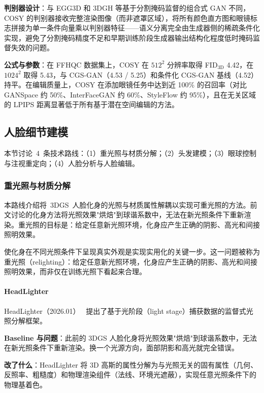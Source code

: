 \textbf{判别器设计}：与 EGG3D 和 3DGH 等基于分割掩码监督的组合式 GAN 不同，COSY 的判别器接收完整渲染图像（而非遮罩区域），将所有颜色直方图和眼镜标志拼接为单一条件向量乘以判别器特征——语义分离完全由生成器侧的稀疏条件化实现，避免了分割掩码精度不足和早期训练阶段生成器输出结构化程度低时掩码监督失效的问题。

\textbf{公式与参数}：在 FFHQC 数据集上，COSY 在 $512^2$ 分辨率取得 FID$_\text{3D}$ 4.42，在 $1024^2$ 取得 5.43，与 CGS-GAN（4.53 / 5.25）和条件化 CGS-GAN 基线（4.52）持平。在编辑质量上，COSY 在添加眼镜任务中达到近 100\% 的召回率（对比 GANSpace 约 50\%、InterFaceGAN 约 60\%、StyleFlow 约 95\%），且在无关区域的 LPIPS 距离显著低于所有基于潜在空间编辑的方法。

\subsection{人脸细节建模}
\label{ss:16_1c}

本节讨论~4~条技术路线：（1）重光照与材质分解；（2）头发建模；（3）眼球控制与注视重定向；（4）人脸分析与人脸编辑。

\subsubsection{重光照与材质分解}

本路线介绍将~3DGS~人脸化身的光照与材质属性解耦以实现可重光照的方法。前文讨论的化身方法将光照效果"烘焙"到球谐系数中，无法在新光照条件下重新渲染。重光照的目标是：给定任意新光照环境，化身应产生正确的阴影、高光和间接照明效果。

使化身在不同光照条件下呈现真实外观是实现实用化的关键一步。这一问题被称为重光照（relighting）：给定任意新光照环境，化身应产生正确的阴影、高光和间接照明效果，而非仅在训练光照下看起来合理。

\paragraph{HeadLighter}

HeadLighter（2026.01）~\cite{2601_02103} 提出了基于光阶段（light stage）捕获数据的监督式光照分解框架。

\textbf{Baseline 与问题}：此前的 3DGS 人脸化身将光照效果"烘焙"到球谐系数中，无法在新光照条件下重新渲染。换一个光源方向，面部阴影和高光就完全错误。

\textbf{改了什么}：HeadLighter 将 3D 高斯的属性分解为与光照无关的固有属性（几何、反照率、粗糙度）和物理渲染组件（法线、环境光遮蔽），实现任意光照条件下的物理基着色。

